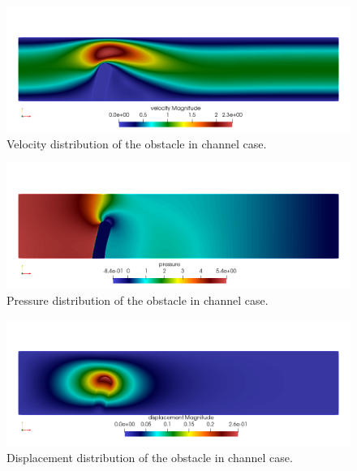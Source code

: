 \begin{figure}[h]
\centering
\includegraphics[width=140mm,viewport=0 5 1024 400,clip]{fsi_obstacle_velo}
\caption{Velocity distribution of the obstacle in channel case.}\label{fg:fsi_obstacle_velo}
\end{figure} 

\begin{figure}[h]
\centering
\includegraphics[width=140mm,viewport=0 5 1024 400,clip]{fsi_obstacle_pres}
\caption{Pressure distribution of the obstacle in channel case.}\label{fg:fsi_obstacle_pres}
\end{figure} 

\begin{figure}[h]
\centering
\includegraphics[width=140mm,viewport=0 5 1024 400,clip]{fsi_obstacle_disp}
\caption{Displacement distribution of the obstacle in channel case.}\label{fg:fsi_obstacle_disp}
\end{figure} 

